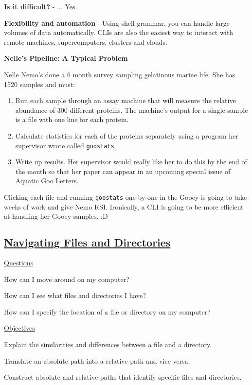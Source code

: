 \documentclass[12pt]{article}
\begin{document}
\newpage
\textbf{Is it difficult?} - ... Yes.

\textbf{Flexibility and automation} - Using shell grammar, you can handle large volumes of data automatically. CLIs are also the easiest way to interact with remote machines, supercomputers, clusters and clouds.

\textbf{Nelle's Pipeline: A Typical Problem}

Nelle Nemo's done a 6 month survey sampling gelatinous marine life. She has 1520 samples and must:
\begin{enumerate}
    \item Run each sample through an assay machine that will measure the relative abundance of 300 different proteins. The machine’s output for a single sample is a file with one line for each protein.
    \item Calculate statistics for each of the proteins separately using a program her supervisor wrote called \texttt{goostats}.
    \item Write up results. Her supervisor would really like her to do this by the end of the month so that her paper can appear in an upcoming special issue of Aquatic Goo Letters.
\end{enumerate}

Clicking each file and running \texttt{goostats} one-by-one in the Gooey is going to take weeks of work and give Nemo RSI. Ironically, a CLI is going to be more efficient at handling her Gooey samples. :D

\subsection{\href{http://swcarpentry.github.io/shell-novice/02-filedir/index.html}{\textbf{Navigating Files and Directories}}}

\color{gray}
\underline{Questions}

How can I move around on my computer?

How can I see what files and directories I have?

How can I specify the location of a file or directory on my computer?

\vspace{1em}
\underline{Objectives}

Explain the similarities and differences between a file and a directory.

Translate an absolute path into a relative path and vice versa.

Construct absolute and relative paths that identify specific files and directories.
\end{document}

